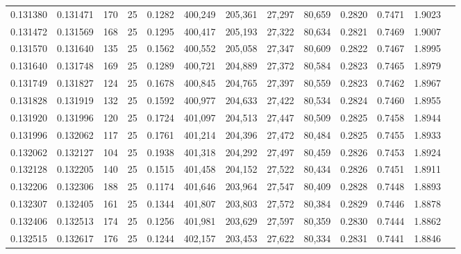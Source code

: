 \begin{tabular}{rrrrrrrrrrrrr}
0.131380 & 0.131471 &   170 &  25 &                                     0.1282 & 400,249 & 205,361 &  27,297 &  80,659 & 0.2820 & 0.7471 & 1.9023 \\
0.131472 & 0.131569 &   168 &  25 &                                     0.1295 & 400,417 & 205,193 &  27,322 &  80,634 & 0.2821 & 0.7469 & 1.9007 \\
0.131570 & 0.131640 &   135 &  25 &                                     0.1562 & 400,552 & 205,058 &  27,347 &  80,609 & 0.2822 & 0.7467 & 1.8995 \\
0.131640 & 0.131748 &   169 &  25 &                                     0.1289 & 400,721 & 204,889 &  27,372 &  80,584 & 0.2823 & 0.7465 & 1.8979 \\
0.131749 & 0.131827 &   124 &  25 &                                     0.1678 & 400,845 & 204,765 &  27,397 &  80,559 & 0.2823 & 0.7462 & 1.8967 \\
0.131828 & 0.131919 &   132 &  25 &                                     0.1592 & 400,977 & 204,633 &  27,422 &  80,534 & 0.2824 & 0.7460 & 1.8955 \\
0.131920 & 0.131996 &   120 &  25 &                                     0.1724 & 401,097 & 204,513 &  27,447 &  80,509 & 0.2825 & 0.7458 & 1.8944 \\
0.131996 & 0.132062 &   117 &  25 &                                     0.1761 & 401,214 & 204,396 &  27,472 &  80,484 & 0.2825 & 0.7455 & 1.8933 \\
0.132062 & 0.132127 &   104 &  25 &                                     0.1938 & 401,318 & 204,292 &  27,497 &  80,459 & 0.2826 & 0.7453 & 1.8924 \\
0.132128 & 0.132205 &   140 &  25 &                                     0.1515 & 401,458 & 204,152 &  27,522 &  80,434 & 0.2826 & 0.7451 & 1.8911 \\
0.132206 & 0.132306 &   188 &  25 &                                     0.1174 & 401,646 & 203,964 &  27,547 &  80,409 & 0.2828 & 0.7448 & 1.8893 \\
0.132307 & 0.132405 &   161 &  25 &                                     0.1344 & 401,807 & 203,803 &  27,572 &  80,384 & 0.2829 & 0.7446 & 1.8878 \\
0.132406 & 0.132513 &   174 &  25 &                                     0.1256 & 401,981 & 203,629 &  27,597 &  80,359 & 0.2830 & 0.7444 & 1.8862 \\
0.132515 & 0.132617 &   176 &  25 &                                     0.1244 & 402,157 & 203,453 &  27,622 &  80,334 & 0.2831 & 0.7441 & 1.8846 \\

\end{tabular}
